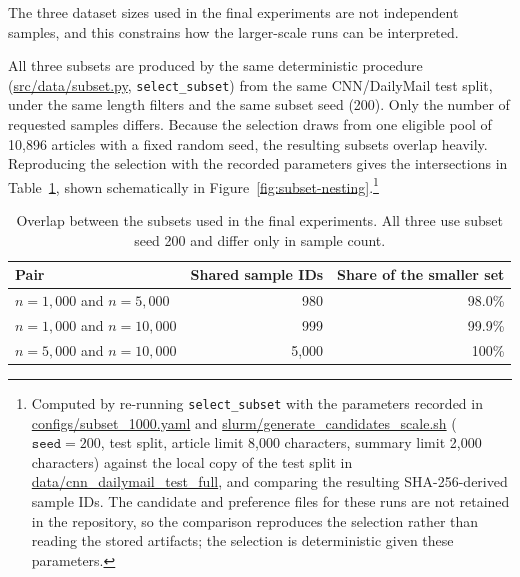The three dataset sizes used in the final experiments are not independent samples,
and this constrains how the larger-scale runs can be interpreted.

All three subsets are produced by the same deterministic procedure
(\url{src/data/subset.py}, \texttt{select\_subset}) from the same CNN/DailyMail
test split, under the same length filters and the same subset seed (200). Only the
number of requested samples differs. Because the selection draws from one eligible
pool of 10{,}896 articles with a fixed random seed, the resulting subsets overlap
heavily. Reproducing the selection with the recorded parameters gives the
intersections in Table~\ref{tab:subset-overlap}, shown schematically in
Figure~\ref{fig:subset-nesting}.\footnote{Computed by re-running
\texttt{select\_subset} with the parameters recorded in
\url{configs/subset_1000.yaml} and \url{slurm/generate_candidates_scale.sh}
($\texttt{seed}=200$, test split, article limit 8{,}000 characters, summary limit
2{,}000 characters) against the local copy of the test split in
\url{data/cnn_dailymail_test_full}, and comparing the resulting SHA-256-derived
sample IDs. The candidate and preference files for these runs are not retained in
the repository, so the comparison reproduces the selection rather than reading the
stored artifacts; the selection is deterministic given these parameters.}

\begin{table}[htbp]
\centering
\caption[Overlap between the three dataset subsets]{Overlap between the subsets used in the final experiments. All three use
subset seed 200 and differ only in sample count.}
\label{tab:subset-overlap}
\begin{tabular}{lrr}
\toprule
Pair & Shared sample IDs & Share of the smaller set \\
\midrule
$n=1{,}000$ and $n=5{,}000$   & 980   & 98.0\% \\
$n=1{,}000$ and $n=10{,}000$  & 999   & 99.9\% \\
$n=5{,}000$ and $n=10{,}000$  & 5{,}000 & 100\% \\
\bottomrule
\end{tabular}
\end{table}

